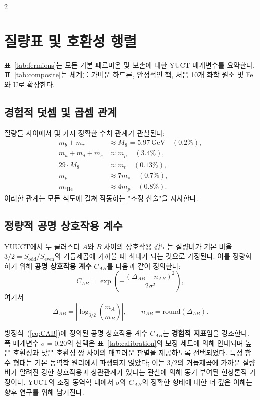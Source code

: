 \documentclass[11pt,a4paper]{article}
\begin{document}
	\begin{multicols}{2}
		
		\section{질량표 및 호환성 행렬}
		\label{sec:tables}
		
		표~\ref{tab:fermions}는 모든 기본 페르미온 및 보손에 대한 YUCT 매개변수를 요약한다. 표~\ref{tab:composite}는 체계를 가벼운 하드론, 안정적인 핵, 처음 10개 화학 원소 및 Fe와 U로 확장한다.
		
		\subsection{경험적 덧셈 및 곱셈 관계}
		
		질량들 사이에서 몇 가지 정확한 수치 관계가 관찰된다:
		\begin{align*}
			m_b + m_\tau &\approx M_8 = 5.97\ \text{GeV} \quad (0.2\%),\\
			m_u + m_d + m_s &\approx m_\mu \quad (3.4\%),\\
			29 \cdot M_8 &\approx m_t \quad (0.13\%),\\
			m_p &\approx 7 m_\pi \quad (0.7\%),\\
			m_{^4\mathrm{He}} &\approx 4 m_p \quad (0.8\%).
		\end{align*}
		이러한 관계는 모든 척도에 걸쳐 작동하는 "조정 산술"을 시사한다.
		
		\subsection{정량적 공명 상호작용 계수}
		
		YUUCT에서 두 클러스터 \(A\)와 \(B\) 사이의 상호작용 강도는 질량비가 기본 비율 \(3/2 = S_{\mathrm{odd}}/S_{\mathrm{even}}\)의 거듭제곱에 가까울 때 최대가 되는 것으로 가정된다. 이를 정량화하기 위해 \textbf{공명 상호작용 계수} \(C_{AB}\)를 다음과 같이 정의한다:
		\begin{equation}
			C_{AB} = \exp\left( - \frac{(\Delta_{AB} - n_{AB})^2}{2\sigma^2} \right),
			\label{eq:CAB}
		\end{equation}
		여기서
		\[
		\Delta_{AB} = \left| \log_{3/2}\left( \frac{m_A}{m_B} \right) \right|, \qquad n_{AB} = \text{round}(\Delta_{AB}).
		\]
		
		방정식~(\ref{eq:CAB})에 정의된 공명 상호작용 계수 \(C_{AB}\)는 \textbf{경험적 지표}임을 강조한다. 폭 매개변수 \(\sigma = 0.20\)의 선택은 표~\ref{tab:calibration}의 보정 세트에 의해 안내되며 높은 호환성과 낮은 호환성 쌍 사이의 매끄러운 판별을 제공하도록 선택되었다. 특정 함수 형태는 기본 동역학 원리에서 파생되지 않았다; 이는 \(3/2\)의 거듭제곱에 가까운 질량비가 알려진 강한 상호작용과 상관관계가 있다는 관찰에 의해 동기 부여된 현상론적 가정이다. YUCT의 조정 동역학 내에서 \(\sigma\)와 \(C_{AB}\)의 정확한 형태에 대한 더 깊은 이해는 향후 연구를 위해 남겨진다.
		

\end{multicols}
\end{document}
